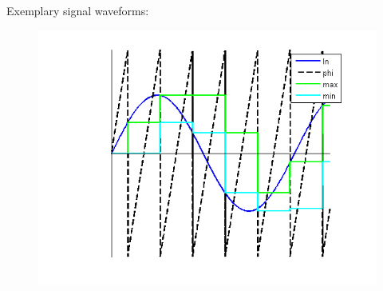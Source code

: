 %
%
%
%
%
Exemplary signal waveforms:
\begin{figure}[H]
	\includegraphics{MinMaxPeriodic_Signal}
\end{figure}